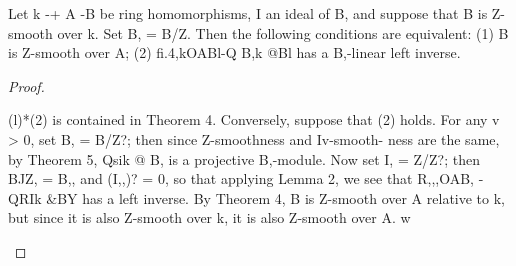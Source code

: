 \begin{theorem}[Theorem 28.6]\label{mcrt-auto-theorem-28-6}\uses{}
\begin{mathematicalrecord}
Let k -+ A -B         be ring homomorphisms,     I an ideal of B,
and suppose that B is Z-smooth over k. Set B, = B/Z. Then the following
conditions are equivalent:
   (1) B is Z-smooth over A;
   (2) fi.4,kOABl-Q B,k @Bl has a B,-linear left inverse.
\end{mathematicalrecord}
\end{theorem}
\begin{proof}
\begin{mathematicalrecord}
(l)*(2)    is contained in Theorem 4. Conversely, suppose that (2)
holds. For any v > 0, set B, = B/Z?; then since Z-smoothness and Iv-smooth-
ness are the same, by Theorem 5, Qsik @ B, is a projective B,-module. Now
set I, = Z/Z?; then BJZ, = B,, and (I,,)? = 0, so that applying Lemma 2, we
see that R,,,OAB,     -QRIk    &BY has a left inverse. By Theorem 4, B is
Z-smooth over A relative to k, but since it is also Z-smooth over k, it is also
Z-smooth over A. w
\end{mathematicalrecord}
\end{proof}


